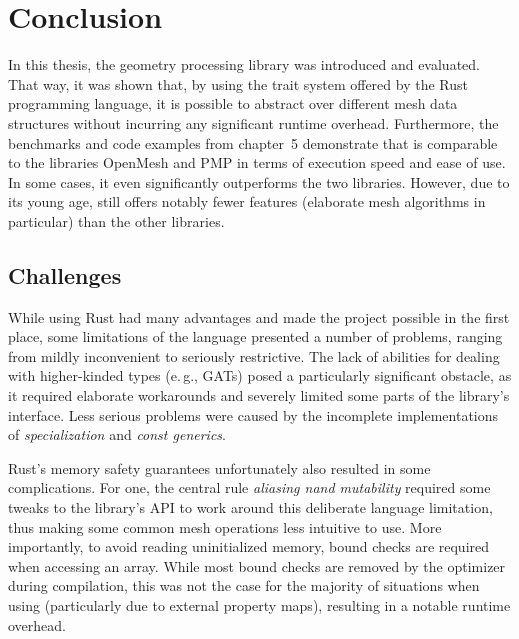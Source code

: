 \chapter{Conclusion}

In this thesis, the geometry processing library  was introduced and evaluated.
That way, it was shown that, by using the trait system offered by the Rust programming language,  it is possible to abstract over different mesh data structures without incurring any significant runtime overhead.
Furthermore, the benchmarks and code examples from chapter~5 demonstrate that  is comparable to the \cpp libraries OpenMesh and PMP in terms of execution speed and ease of use.
In some cases, it even significantly outperforms the two \cpp libraries.
However, due to its young age,  still offers notably fewer features (elaborate mesh algorithms in particular) than the other libraries.



\vfill
\section{Challenges}

While using Rust had many advantages and made the project possible in the first place, some limitations of the language presented a number of problems, ranging from mildly inconvenient to seriously restrictive.
The lack of abilities for dealing with higher-kinded types (e.\,g., GATs) posed a particularly significant obstacle, as it required elaborate workarounds and severely limited some parts of the library's interface.
Less serious problems were caused by the incomplete implementations of \emph{specialization} and \emph{const generics}.

Rust's memory safety guarantees unfortunately also resulted in some complications.
For one, the central rule \emph{aliasing nand mutability} required some tweaks to the library's API to work around this deliberate language limitation, thus making some common mesh operations less intuitive to use.
More importantly, to avoid reading uninitialized memory, bound checks are required when accessing an array.
While most bound checks are removed by the optimizer during compilation, this was not the case for the majority of situations when using  (particularly due to external property maps), resulting in a notable runtime overhead.

